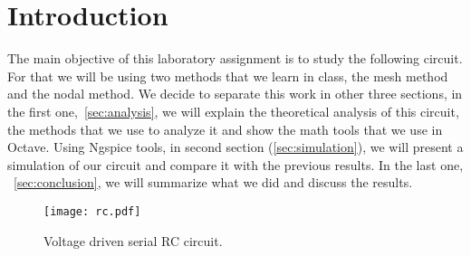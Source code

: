 
\section{Introduction}
\label{sec:introduction}


The main objective of this laboratory assignment is to study the following circuit. For that we will be using two methods that we learn in class, the mesh method and the nodal method. We decide to separate this work in other three sections, in the first one,~\ref{sec:analysis}, we will explain the theoretical analysis of this circuit, the methods that we use to analyze it and show the math tools that we use in Octave. Using Ngspice tools, in second section (\ref{sec:simulation}), we will present a simulation of our circuit and compare it with the previous results. In the last one, ~\ref{sec:conclusion}, we will summarize what we did and discuss the results.

\lipsum[1-1]



\begin{figure}[h] \centering
\texttt{[image: rc.pdf]}
\caption{Voltage driven serial RC circuit.}
\label{fig:rc}
\end{figure}
